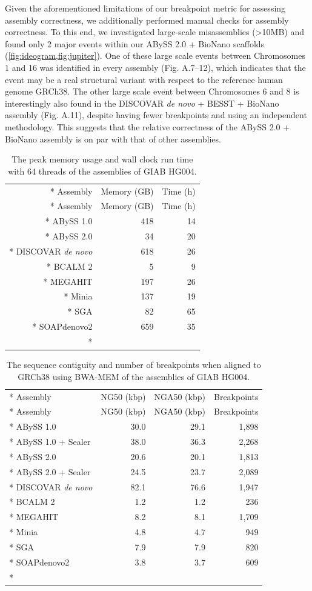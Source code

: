 \documentclass[
  12pt,
  oneside,
  openany]{book}
\begin{document}
Given the aforementioned limitations of our breakpoint metric for assessing assembly correctness, we additionally performed manual checks for assembly correctness. To this end, we investigated large-scale misassemblies (\textgreater10MB) and found only 2 major events within our ABySS 2.0 + BioNano scaffolds (\cref{fig:ideogram,fig:jupiter}). One of these large scale events between Chromosomes 1 and 16 was identified in every assembly (Fig. A.7--12), which indicates that the event may be a real structural variant with respect to the reference human genome GRCh38. The other large scale event between Chromosomes 6 and 8 is interestingly also found in the DISCOVAR \emph{de novo} + BESST + BioNano assembly (Fig. A.11), despite having fewer breakpoints and using an independent methodology. This suggests that the relative correctness of the ABySS 2.0 + BioNano assembly is on par with that of other assemblies.

\hypertarget{tbl:mem}{}
\begin{singlespace}
\small
\begin{longtable}[]{@{}rrr@{}}
\caption[The peak memory usage and wall clock run time with 64 threads of the assemblies of GIAB HG004.]{\label{tbl:mem}The peak memory usage and wall clock run time with 64 threads of the assemblies of GIAB HG004.}\tabularnewline*
\toprule
Assembly & Memory (GB) & Time (h)\tabularnewline*
\midrule
\endfirsthead
\toprule
Assembly & Memory (GB) & Time (h)\tabularnewline*
\midrule
\endhead
ABySS 1.0 & 418 & 14\tabularnewline*
ABySS 2.0 & 34 & 20\tabularnewline*
DISCOVAR \emph{de novo} & 618 & 26\tabularnewline*
BCALM 2 & 5 & 9\tabularnewline*
MEGAHIT & 197 & 26\tabularnewline*
Minia & 137 & 19\tabularnewline*
SGA & 82 & 65\tabularnewline*
SOAPdenovo2 & 659 & 35\tabularnewline*
\bottomrule
\end{longtable}
\end{singlespace}

\hypertarget{tbl:contigs}{}
\begin{singlespace}
\small
\begin{longtable}[]{@{}lrrr@{}}
\caption[The sequence contiguity and number of breakpoints when aligned to GRCh38 using BWA-MEM of the assemblies of GIAB HG004.]{\label{tbl:contigs}The sequence contiguity and number of breakpoints when aligned to GRCh38 using BWA-MEM of the assemblies of GIAB HG004.}\tabularnewline*
\toprule
Assembly & NG50 (kbp) & NGA50 (kbp) & Breakpoints\tabularnewline*
\midrule
\endfirsthead
\toprule
Assembly & NG50 (kbp) & NGA50 (kbp) & Breakpoints\tabularnewline*
\midrule
\endhead
ABySS 1.0 & 30.0 & 29.1 & 1,898\tabularnewline*
ABySS 1.0 + Sealer & 38.0 & 36.3 & 2,268\tabularnewline*
ABySS 2.0 & 20.6 & 20.1 & 1,813\tabularnewline*
ABySS 2.0 + Sealer & 24.5 & 23.7 & 2,089\tabularnewline*
DISCOVAR \emph{de novo} & 82.1 & 76.6 & 1,947\tabularnewline*
BCALM 2 & 1.2 & 1.2 & 236\tabularnewline*
MEGAHIT & 8.2 & 8.1 & 1,709\tabularnewline*
Minia & 4.8 & 4.7 & 949\tabularnewline*
SGA & 7.9 & 7.9 & 820\tabularnewline*
SOAPdenovo2 & 3.8 & 3.7 & 609\tabularnewline*
\bottomrule
\end{longtable}
\end{singlespace}
\end{document}
